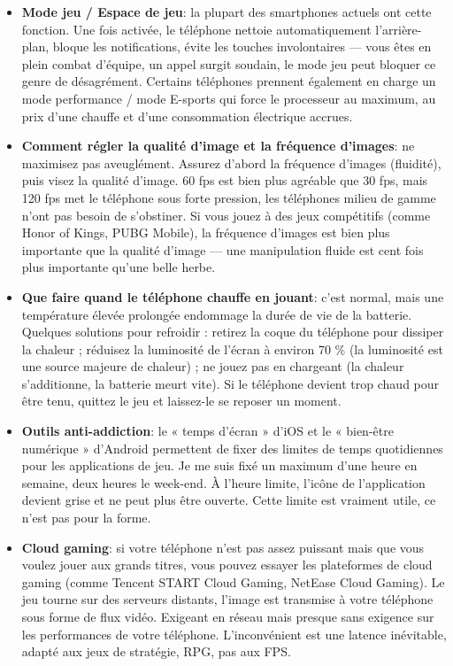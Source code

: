 \begin{itemize}
  \item \textbf{Mode jeu / Espace de jeu}: la plupart des smartphones actuels ont cette fonction. Une fois activée, le téléphone nettoie automatiquement l'arrière-plan, bloque les notifications, évite les touches involontaires — vous êtes en plein combat d'équipe, un appel surgit soudain, le mode jeu peut bloquer ce genre de désagrément. Certains téléphones prennent également en charge un mode performance / mode E-sports qui force le processeur au maximum, au prix d'une chauffe et d'une consommation électrique accrues.
  \item \textbf{Comment régler la qualité d'image et la fréquence d'images}: ne maximisez pas aveuglément. Assurez d'abord la fréquence d'images (fluidité), puis visez la qualité d'image. 60 fps est bien plus agréable que 30 fps, mais 120 fps met le téléphone sous forte pression, les téléphones milieu de gamme n'ont pas besoin de s'obstiner. Si vous jouez à des jeux compétitifs (comme Honor of Kings, PUBG Mobile), la fréquence d'images est bien plus importante que la qualité d'image — une manipulation fluide est cent fois plus importante qu'une belle herbe.
  \item \textbf{Que faire quand le téléphone chauffe en jouant}: c'est normal, mais une température élevée prolongée endommage la durée de vie de la batterie. Quelques solutions pour refroidir : retirez la coque du téléphone pour dissiper la chaleur ; réduisez la luminosité de l'écran à environ 70 \% (la luminosité est une source majeure de chaleur) ; ne jouez pas en chargeant (la chaleur s'additionne, la batterie meurt vite). Si le téléphone devient trop chaud pour être tenu, quittez le jeu et laissez-le se reposer un moment.
  \item \textbf{Outils anti-addiction}: le « temps d'écran » d'iOS et le « bien-être numérique » d'Android permettent de fixer des limites de temps quotidiennes pour les applications de jeu. Je me suis fixé un maximum d'une heure en semaine, deux heures le week-end. À l'heure limite, l'icône de l'application devient grise et ne peut plus être ouverte. Cette limite est vraiment utile, ce n'est pas pour la forme.
  \item \textbf{Cloud gaming}: si votre téléphone n'est pas assez puissant mais que vous voulez jouer aux grands titres, vous pouvez essayer les plateformes de cloud gaming (comme Tencent START Cloud Gaming, NetEase Cloud Gaming). Le jeu tourne sur des serveurs distants, l'image est transmise à votre téléphone sous forme de flux vidéo. Exigeant en réseau mais presque sans exigence sur les performances de votre téléphone. L'inconvénient est une latence inévitable, adapté aux jeux de stratégie, RPG, pas aux FPS.
\end{itemize}

